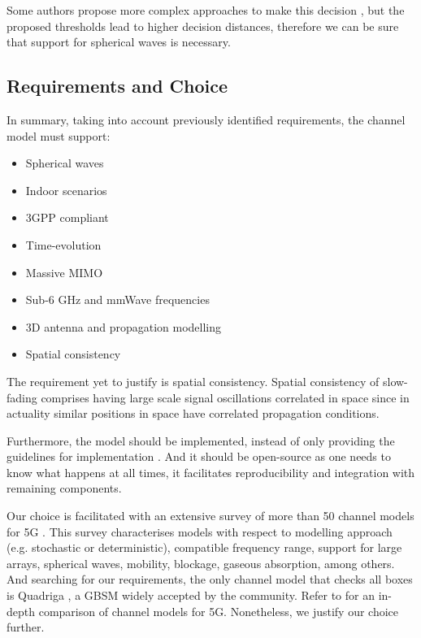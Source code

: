 Some authors propose more complex approaches to make this decision \cite{4799060}, but the proposed thresholds lead to higher decision distances, therefore we can be sure that support for spherical waves is necessary.

\vspace{.5cm}
\subsection*{Requirements and Choice}

In summary, taking into account previously identified requirements, the channel model must support:

\setlength{\columnsep}{-2.5cm}
\begin{multicols}{2} 
    \begin{itemize}
        \item Spherical waves
        \item Indoor scenarios
        \item 3GPP compliant
        \item Time-evolution
        \item Massive MIMO
        \item Sub-6 GHz and mmWave frequencies
        \item 3D antenna and propagation modelling
        \item Spatial consistency
    \end{itemize}
\end{multicols}

The requirement yet to justify is spatial consistency. Spatial consistency of slow-fading comprises having large scale signal oscillations correlated in space since in actuality similar positions in space have correlated propagation conditions.

Furthermore, the model should be implemented, instead of only providing the guidelines for implementation \cite{7481518}. And it should be open-source as one needs to know what happens  at all times, it facilitates reproducibility and integration with remaining components. 

Our choice is facilitated with an extensive survey of more than 50 channel models for 5G \cite{channel_survey}. This survey characterises models with respect to modelling approach (e.g. stochastic or deterministic), compatible frequency range, support for large arrays, spherical waves, mobility, blockage, gaseous absorption, among others. And searching for our requirements, the only channel model that checks all boxes is Quadriga \cite{quadriga}, a \ac{GBSM} widely accepted by the community. Refer to \cite{channel_survey} for an in-depth comparison of channel models for 5G. Nonetheless, we justify our choice further.

